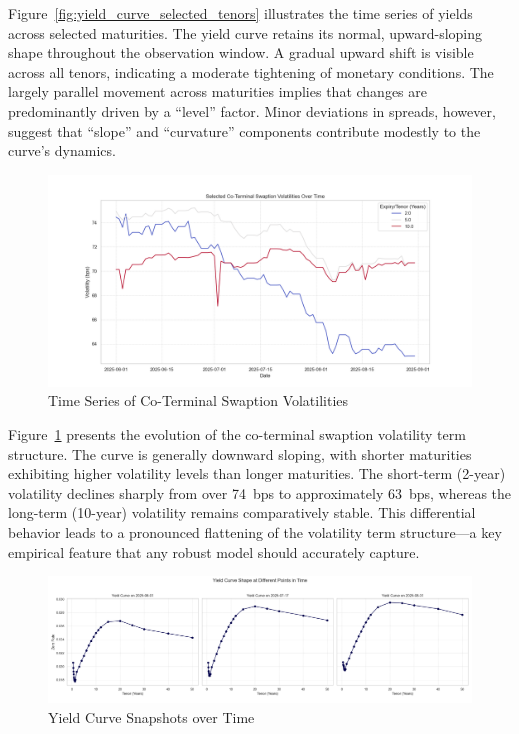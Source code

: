 Figure~\ref{fig:yield_curve_selected_tenors} illustrates the time series of yields across selected maturities. The yield curve retains its normal, upward-sloping shape throughout the observation window. A gradual upward shift is visible across all tenors, indicating a moderate tightening of monetary conditions. The largely parallel movement across maturities implies that changes are predominantly driven by a “level” factor. Minor deviations in spreads, however, suggest that “slope” and “curvature” components contribute modestly to the curve’s dynamics.

\begin{figure}[H]
	\centering
	\includegraphics[width=1\textwidth]{images/descriptive_data_analysis/vol_surface_coterminal_series.png}
	\caption{Time Series of Co-Terminal Swaption Volatilities}
	\label{fig:vol_surface_coterminal_series}
\end{figure}

Figure~\ref{fig:vol_surface_coterminal_series} presents the evolution of the co-terminal swaption volatility term structure. The curve is generally downward sloping, with shorter maturities exhibiting higher volatility levels than longer maturities. The short-term (2-year) volatility declines sharply from over 74~bps to approximately 63~bps, whereas the long-term (10-year) volatility remains comparatively stable. This differential behavior leads to a pronounced flattening of the volatility term structure—a key empirical feature that any robust model should accurately capture.

\begin{figure}[H]
	\centering
	\includegraphics[width=1\textwidth]{images/descriptive_data_analysis/yield_curve_2d_snapshots.png}
	\caption{Yield Curve Snapshots over Time}
	\label{fig:yield_curve_2d_snapshots}
\end{figure}

